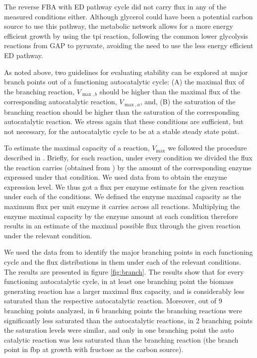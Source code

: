 \documentclass[a4page,notitlepage]{article}
\begin{document}
    The reverse FBA with ED pathway cycle did not carry flux in any of the measured conditions either.
    Although glycerol could have been a potential carbon source to use this pathway, the metabolic network allows for a more energy efficient growth by using the tpi reaction, following the common lower glycolysis reactions from GAP to pyruvate, avoiding the need to use the less energy efficient ED pathway.

    As noted above, two guidelines for evaluating stability can be explored at major branch points out of a functioning autocatalytic cycle: (A) the maximal flux of the branching reaction, $V_{\max,b}$ should be higher than the maximal flux of the corresponding autocatalytic reaction, $V_{\max,a}$, and, (B) the saturation of the branching reaction should be higher than the saturation of the corresponding autocatalytic reaction.
    We stress again that these conditions are sufficient, but not necessary, for the autocatalytic cycle to be at a stable steady state point.

    To estimate the maximal capacity of a reaction, $V_{\max}$ we followed the procedure described in \cite{Davidi2016-ga}.
    Briefly, for each reaction, under every condition we divided the flux the reaction carries (obtained from \cite{Gerosa2015-oq}) by the amount of the corresponding enzyme expressed under that condition.
    We used data from \cite{Schmidt2015} to obtain the enzyme expression level.
    We thus got a flux per enzyme estimate for the given reaction under each of the conditions.
    We defined the enzyme maximal capacity as the maximum flux per unit enzyme it carries across all reactions.
    Multiplying the enzyme maximal capacity by the enzyme amount at each condition therefore results in an estimate of the maximal possible flux through the given reaction under the relevant condition.


    We used the data from \cite{Gerosa2015-oq} to identify the major branching points in each functioning cycle and the flux distributions in them under each of the relevant conditions.
    The results are presented in figure \ref{fig:branch}.
    The results show that for every functioning autocatalytic cycle, in at least one branching point the biomass generating reaction has a larger maximal flux capacity, and is considerably less saturated than the respective autocatalytic reaction.
    Moreover, out of 9 branching points analyzed, in 6 branching points the branching reactions were significantly less saturated than the autocatalytic reactions, in 2 branching points the saturation levels were similar, and only in one branching point the auto catalytic reaction was less saturated than the branching reaction (the branch point in fbp at growth with fructose as the carbon source).
\end{document}
